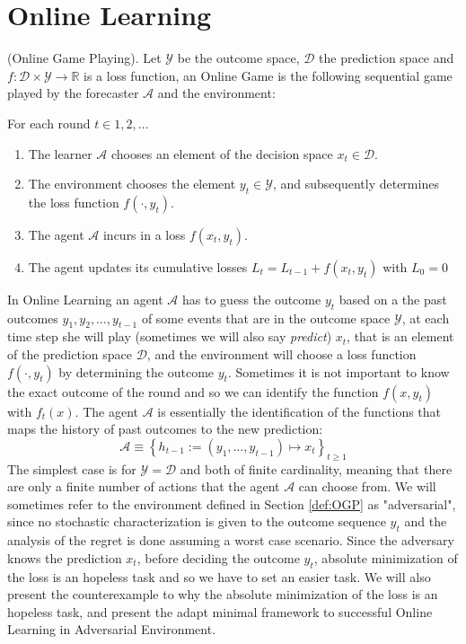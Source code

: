 \section{Online Learning}
\label{sec:OnlineLearning}
\begin{definition}(Online Game Playing).\label{def:OGP}
    Let $\mathcal Y$ be the outcome space, $\mathcal D$ the prediction space and $f:\mathcal D\times\mathcal Y\to \mathbb R$ is a loss function, an Online Game is the following sequential game played by the forecaster $\mathcal A$ and the environment:

    For each round $t\in 1,2,\ldots$
    \begin{enumerate}
        \item The learner $\mathcal A$ chooses an element of the decision space $x_t\in\mathcal D$.
        \item The environment chooses the element $y_t\in\mathcal Y$, and subsequently determines the loss function $f(\cdot,y_t)$.
        \item The agent $\mathcal A$ incurs in a loss $f(x_t,y_t)$.
		\item The agent updates its cumulative losses $L_t=L_{t-1}+f(x_t,y_t)$ with $L_0=0$
    \end{enumerate}
\end{definition}

In Online Learning an agent $\mathcal A$ has to guess the outcome $y_t$ based on a the past outcomes $y_1,y_2,\ldots,y_{t-1}$ of some events that are in the outcome space $\mathcal Y$, at each time step she will play (sometimes we will also say \emph{predict}) $x_t$, that is an element of the prediction space $\mathcal D$, and the environment will choose a loss function $f(\cdot,y_t)$ by determining the outcome $y_t$.
Sometimes it is not important to know the exact outcome of the round and so we can identify the function $f(x,y_t)$ with $f_t(x)$. The agent $\mathcal A$ is essentially the identification of the functions that maps the history of past outcomes to the new prediction:
$$\mathcal A\equiv\left\{h_{t-1}:=(y_1,\ldots,y_{t-1})\longmapsto x_t\right\}_{t\ge 1} $$
The simplest case is for $\mathcal Y=\mathcal D$ and both of finite cardinality, meaning that there are only a finite number of actions that the agent $\mathcal A$ can choose from. 
We will sometimes refer to the environment defined in Section \ref{def:OGP} as "adversarial", since no stochastic characterization is given to the outcome sequence $y_t$ and the analysis of the regret is done assuming a worst case scenario.
Since the adversary knows the prediction $x_t$, before deciding the outcome $y_t$, absolute minimization  of the loss is an hopeless task and so we have to set an easier task. We will also present the counterexample to why the absolute minimization of the loss is an hopeless task, and present the adapt minimal framework to successful Online Learning in Adversarial Environment.

